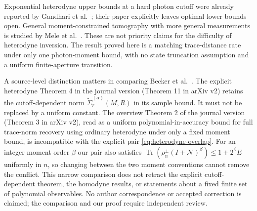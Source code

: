 Exponential heterodyne upper bounds at a hard photon cutoff were already
reported by Gandhari et al.~\cite{Gandhari2024}; their paper explicitly
leaves optimal lower bounds open. General moment-constrained tomography
with more general measurements is studied by Mele et al.~\cite{Mele2025}.
These are not priority claims for the difficulty of heterodyne inversion.
The result proved here is a matching trace-distance rate under only one
photon-moment bound, with no state truncation assumption and a uniform
finite-aperture transition.

A source-level distinction matters in comparing Becker et al.~\cite{BDLR2024}.
The explicit heterodyne Theorem 4 in the journal version (Theorem 11 in
arXiv v2) retains the cutoff-dependent norm
$\widetilde\Sigma_r^{(\alpha)}(M,R)$ in its sample bound. It must not be
replaced by a uniform constant. The overview Theorem 2 of the journal
version (Theorem 3 in arXiv v2), read as a uniform polynomial-in-accuracy
bound for full trace-norm recovery using ordinary heterodyne under only a
fixed moment bound, is incompatible with the explicit pair
\eqref{eq:heterodyne-overlap}. For an integer moment order $\beta$ our pair
also satisfies
$\operatorname{Tr}(\rho_n^\pm(I+\mathcal N)^\beta)\le1+2^\beta E$ uniformly
in $n$, so changing between the two moment conventions cannot remove the
conflict. This narrow comparison does not retract the explicit
cutoff-dependent theorem, the homodyne results, or statements about a fixed
finite set of polynomial observables. No author correspondence or accepted
correction is claimed; the comparison and our proof require independent
review.
